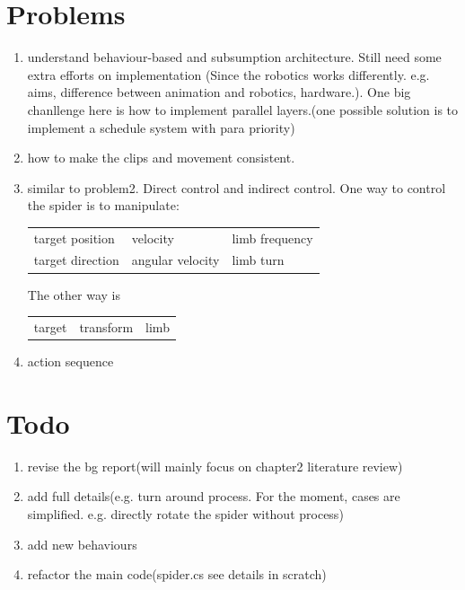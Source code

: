 \documentclass[11pt]{article}
\begin{document}
\section{Problems}
\label{sec-4}
\begin{enumerate}
\item understand behaviour-based and subsumption architecture. 
Still need some extra efforts on implementation
(Since the robotics works differently. e.g. aims, difference between animation and
robotics, hardware.).
One big chanllenge here is how to implement parallel layers.(one possible solution 
is to implement a schedule system with para priority)

\item how to make the clips and movement consistent.
\item similar to problem2. Direct control and indirect control.
One way to control the spider is to manipulate:
\begin{center}
\begin{tabular}{lll}
target position & velocity & limb frequency\\
target direction & angular velocity & limb turn\\
\end{tabular}
\end{center}

The other way is 
\begin{center}
\begin{tabular}{lll}
target & transform & limb\\
\end{tabular}
\end{center}

\item action sequence
\end{enumerate}


\section{Todo}
\label{sec-5}

\begin{enumerate}
\item revise the bg report(will mainly focus on chapter2 literature review)
\item add full details(e.g. turn around process. For the moment, cases are simplified. e.g. directly rotate the spider without process)
\item add new behaviours
\item refactor the main code(spider.cs see details in scratch)
\end{enumerate}
\end{document}
